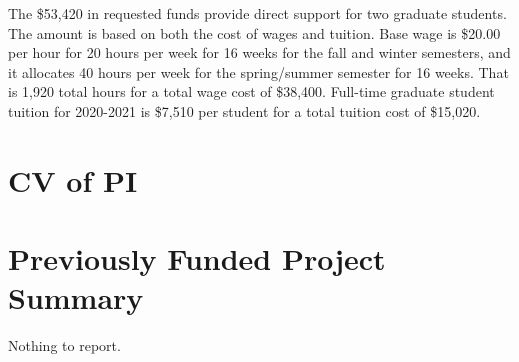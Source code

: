 \documentclass[11pt,onecolumn,notitlepage]{article}
\begin{document}
The \$53,420 in requested funds provide direct support for two graduate students. The amount is based on both the cost of wages and tuition. Base wage is \$20.00 per hour for 20 hours per week for 16 weeks for the fall and winter semesters, and it allocates 40 hours per week for the spring/summer semester for 16 weeks. That is 1,920 total hours for a total wage cost of \$38,400. Full-time graduate student tuition for 2020-2021 is \$7,510 per student for a total tuition cost of \$15,020. 

\appendix
\appendixpage




\section{CV of PI}

\section{Previously Funded Project Summary}
Nothing to report.
\end{document}
